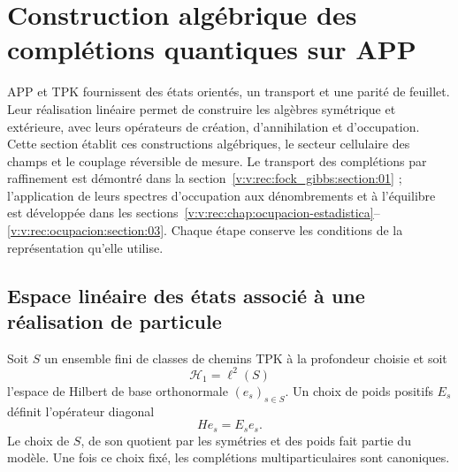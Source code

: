 \section{Construction algébrique des complétions quantiques sur APP}
\label{v:v:rec:chap:completaciones-cuanticas}
\label{v:v:sec:completaciones-algebraicas}

APP et TPK fournissent des états orientés, un transport et une parité de feuillet.
Leur réalisation linéaire permet de construire les algèbres symétrique et extérieure,
avec leurs opérateurs de création, d’annihilation et d’occupation. Cette section
établit ces constructions algébriques, le secteur cellulaire des champs et
le couplage réversible de mesure. Le transport des complétions
par raffinement est démontré dans la
section~\ref{v:v:rec:fock_gibbs:section:01} ; l’application de leurs spectres
d’occupation aux dénombrements et à l’équilibre est développée dans les
sections~\ref{v:v:rec:chap:ocupacion-estadistica}--\ref{v:v:rec:ocupacion:section:03}.
Chaque étape conserve les conditions de la représentation qu’elle utilise.

\subsection{Espace linéaire des états associé à une réalisation de particule}
\label{v:v:rec:completaciones:section:02}

Soit \(S\) un ensemble fini de classes de chemins TPK à la profondeur choisie
et soit
\[
 \mathcal H_1=\ell^2(S)
\]
l’espace de Hilbert de base orthonormale \((e_s)_{s\in S}\). Un choix de
poids positifs \(E_s\) définit l’opérateur diagonal
\[
 He_s=E_se_s.
\]
Le choix de \(S\), de son quotient par les symétries et des poids fait partie
du modèle. Une fois ce choix fixé, les complétions multiparticulaires sont canoniques.


